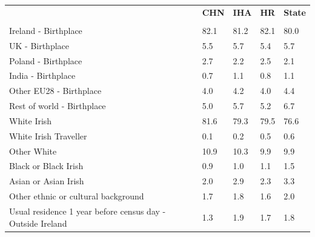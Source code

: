 \documentclass{article}
\begin{document}
\pagebreak
\begin{table}[h]	
\centering
		\begin{tabular}{KTTTT}
  \hline
& \textbf{CHN} & \textbf{IHA} & \textbf{HR}& \textbf{State}\\ 
  \hline
    \\ 
    \hline
Ireland - Birthplace & 82.1& 81.2& 82.1& 80.0\\
UK - Birthplace & 5.5& 5.7& 5.4& 5.7\\
Poland - Birthplace & 2.7& 2.2& 2.5& 2.1\\
India - Birthplace & 0.7& 1.1& 0.8& 1.1\\
Other EU28 - Birthplace & 4.0& 4.2& 4.0& 4.4\\
Rest of world - Birthplace & 5.0& 5.7& 5.2& 6.7\\
    \hline
White Irish & 81.6& 79.3& 79.5& 76.6\\
White Irish Traveller & 0.1& 0.2& 0.5& 0.6\\
Other White & 10.9& 10.3&  9.9&  9.9\\
Black or Black Irish & 0.9& 1.0& 1.1& 1.5\\
Asian or Asian Irish & 2.0& 2.9& 2.3& 3.3\\
Other ethnic or cultural background & 1.7& 1.8& 1.6& 2.0\\
    \hline
Usual residence 1 year before census day - Outside Ireland & 1.3& 1.9& 1.7& 1.8\\


\end{tabular}
\end{table}
\end{document}
